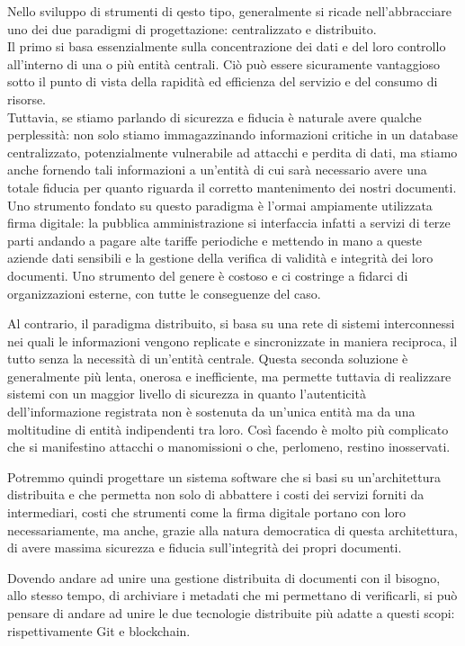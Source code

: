 Nello sviluppo di strumenti di qesto tipo, generalmente si ricade nell'abbracciare
uno dei due paradigmi di progettazione: centralizzato e distribuito.
\\
Il primo si basa essenzialmente sulla concentrazione dei dati e del loro controllo
all'interno di una o più entità centrali. Ciò può essere sicuramente vantaggioso sotto
il punto di vista della rapidità ed efficienza del servizio e del consumo di risorse.
\\
Tuttavia, se stiamo parlando di sicurezza e fiducia è naturale avere qualche perplessità:
non solo stiamo immagazzinando informazioni critiche in un database centralizzato,
potenzialmente vulnerabile ad attacchi e perdita di dati, ma stiamo anche fornendo
tali informazioni a un'entità di cui sarà necessario avere una totale fiducia per quanto
riguarda il corretto mantenimento dei nostri documenti.
\\
Uno strumento fondato su questo paradigma è l'ormai ampiamente utilizzata firma digitale:
la pubblica amministrazione si interfaccia infatti a servizi di terze parti andando a pagare
alte tariffe periodiche e mettendo in mano a queste aziende dati sensibili e la gestione della
verifica di validità e integrità dei loro documenti.
Uno strumento del genere è costoso e ci costringe a fidarci
di organizzazioni esterne, con tutte le conseguenze del caso.

Al contrario, il paradigma distribuito, si basa su una rete di sistemi interconnessi nei
quali le informazioni vengono replicate e sincronizzate in maniera reciproca, il tutto senza
la necessità di un'entità centrale. 
Questa seconda soluzione è generalmente più lenta, onerosa e inefficiente,
ma permette tuttavia di realizzare sistemi con un maggior livello di sicurezza in quanto
l'autenticità dell'informazione registrata non è sostenuta da un'unica entità ma da una
moltitudine di entità indipendenti tra loro.
Così facendo è molto più complicato che si manifestino attacchi o manomissioni
o che, perlomeno, restino inosservati.

Potremmo quindi progettare un sistema software che si basi su un'architettura distribuita
e che permetta non solo di abbattere i costi dei servizi forniti da intermediari,
costi che strumenti come la firma digitale portano con loro necessariamente, ma anche,
grazie alla natura democratica di questa architettura, di avere massima sicurezza
e fiducia sull'integrità dei propri documenti.

Dovendo andare ad unire una gestione distribuita di documenti con il bisogno, allo stesso 
tempo, di archiviare i metadati che mi permettano di verificarli, si può pensare di andare
ad unire le due tecnologie distribuite più adatte a questi scopi:
rispettivamente Git e blockchain.

